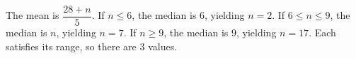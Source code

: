 The mean is $\dfrac{28+n}{5}$. If $n\le6$, the median is $6$, yielding $n=2$. If $6\le n\le9$, the median is $n$, yielding $n=7$. If $n\ge9$, the median is $9$, yielding $n=17$. Each satisfies its range, so there are $\boxed3$ values.
